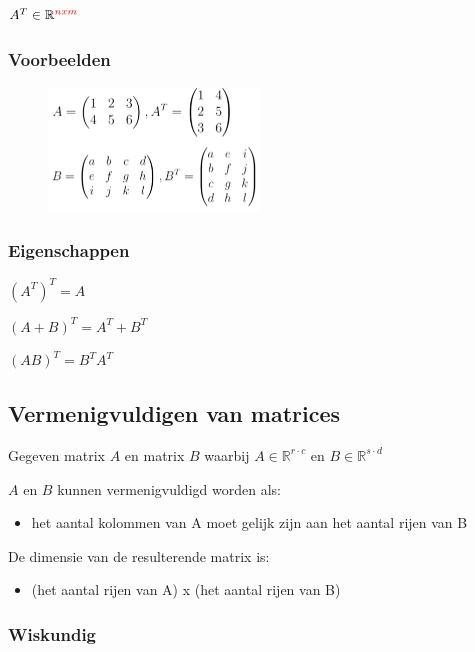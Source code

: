 \documentclass{article}
\begin{document}
$A^T \in \mathbb{R}^{\textcolor{red}{nxm}}$

\subsubsection{Voorbeelden}

\begin{figure}[H]
    \centering
    \includegraphics[width=0.5\textwidth]{matrix-getransponeerd-voorbeelden.png}
\end{figure}


\subsubsection{Eigenschappen}

$(A^T)^T = A$

$(A + B)^T = A^T + B^T$

$(AB)^T = B^T A^T$

\subsection{Vermenigvuldigen van matrices}

Gegeven matrix $A$ en matrix $B$ waarbij $A \in \mathbb{R}^{r\cdot c}$ en $B \in \mathbb{R}^{s \cdot d}$

$A$ en $B$ kunnen vermenigvuldigd worden als:

\begin{itemize}
    \item het aantal kolommen van A moet gelijk zijn aan het aantal rijen van B
\end{itemize}

De dimensie van de resulterende matrix is:

\begin{itemize}
    \item (het aantal rijen van A) x (het aantal rijen van B)
\end{itemize}

\subsubsection{Wiskundig}
\end{document}
